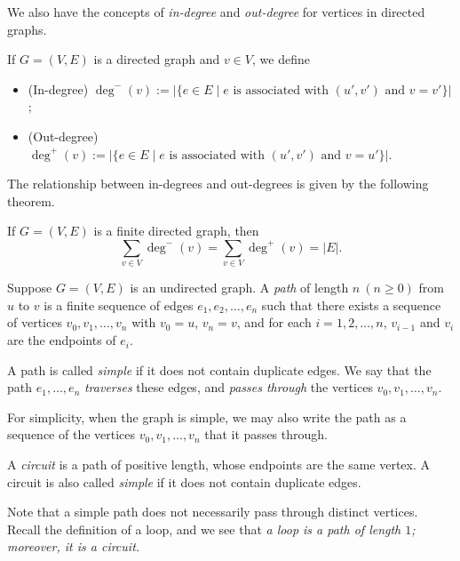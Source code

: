 We also have the concepts of \emph{in-degree} and \emph{out-degree} for vertices in directed graphs.

\begin{definition}
    If $G=(V, E)$ is a directed graph and $v\in V$, we define
    \begin{itemize}
        \item (In-degree) $\deg^-(v):=|\{e\in E\mid e\text{ is associated with }(u',v')\text{ and }v=v'\}|$;
        \item (Out-degree) $\deg^+(v):=|\{e\in E\mid e\text{ is associated with }(u',v')\text{ and }v=u'\}|$.
    \end{itemize}
\end{definition}

The relationship between in-degrees and out-degrees is given by the following theorem.

\begin{theorem}
    If $G=(V,E)$ is a finite directed graph, then \[\sum_{v\in V}\deg^-(v)=\sum_{v\in V}\deg^+(v)=|E|.\]
\end{theorem}

\begin{definition}[Path]
    Suppose $G=(V,E)$ is an undirected graph. A \emph{path} of length $n\ (n\geq 0)$ from $u$ to $v$ is a finite sequence of edges $e_1,e_2,\dots,e_n$ such that there exists a sequence of vertices $v_0,v_1,\dots,v_n$ with $v_0=u$, $v_n=v$, and for each $i=1,2,\dots,n$, $v_{i-1}$ and $v_i$ are the endpoints of $e_i$.

    A path is called \emph{simple} if it does not contain duplicate edges. We say that the path $e_1,\dots,e_n$ \emph{traverses} these edges, and \emph{passes through} the vertices $v_0,v_1,\dots,v_n$.
\end{definition}

For simplicity, when the graph is simple, we may also write the path as a sequence of the vertices $v_0,v_1,\dots,v_n$ that it passes through. 

\begin{definition}[Circuit]
    A \emph{circuit} is a path of positive length, whose endpoints are the same vertex. A circuit is also called \emph{simple} if it does not contain duplicate edges.
\end{definition}

Note that a simple path does not necessarily pass through distinct vertices. Recall the definition of a loop, and we see that \emph{a loop is a path of length $1$; moreover, it is a circuit.}

